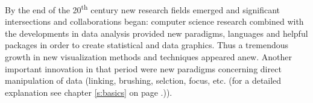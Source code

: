 By the end of the 20\textsuperscript{th} century new research fields emerged and significant intersections and collaborations began: computer science research combined with the developments in data analysis provided new paradigms, languages and helpful packages in order to create statistical and data graphics. Thus a tremendous growth in new visualization methods and techniques appeared anew.
Another important innovation in that period were new paradigms  concerning direct manipulation of data (linking, brushing, selction, focus, etc. (for a detailed explanation see chapter \ref{s:basics} on page \pageref{s:basics}.)).